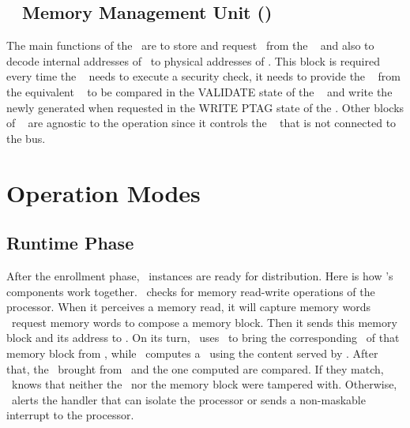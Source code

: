 \subsection{\ptag~ Memory Management Unit (\pmmu)}
\label{subsec:pmmu}
The main functions of the \pmmu~are to store and request \ptags~from the \ptagmem~ and also to decode internal addresses of \ptags~to physical addresses of \ptagmem. This block is required every time the \handler~ needs to execute a security check, it needs to provide the \ptag ~ from the equivalent \slines~  to be compared in the VALIDATE state of the \seceng~  and write the newly generated \ptags when requested in the WRITE PTAG state of the \seceng.  Other blocks of \cshia~ are agnostic to the \pmmu operation since it controls the \ptagmem~ that is not connected to the bus.


\section{Operation Modes}
\label{sec:opmodes}



\subsection{Runtime Phase}
\label{subsec:runtimephase}
\def\fenroll{Figure \ref{fig:fuzzy-extractor} \subref{fig:fuzzy-enroll}}
\def\fregen{Figure \ref{fig:fuzzy-extractor} \subref{fig:fuzzy-regen}}
After the enrollment phase, \cshia~instances are ready for distribution. Here is how \cshia's components work together. \handler~checks for memory read-write operations of the processor. When it perceives a memory read, it will capture memory words \andor~request memory words to compose a memory block. Then it sends this memory block and its address to \seceng. On its turn, \seceng~uses \pmmu~to bring the corresponding \ptag~of that memory block from \ptagmem, while \ptaggen~computes a \ptag~using the content served by \handler. After that, the \ptag~brought from \ptagmem~and the one computed are compared. If they match, \seceng~knows that neither the \ptag~nor the memory block were tampered with. Otherwise, \seceng~alerts the handler that can isolate the processor or sends a non-maskable interrupt to the processor.



